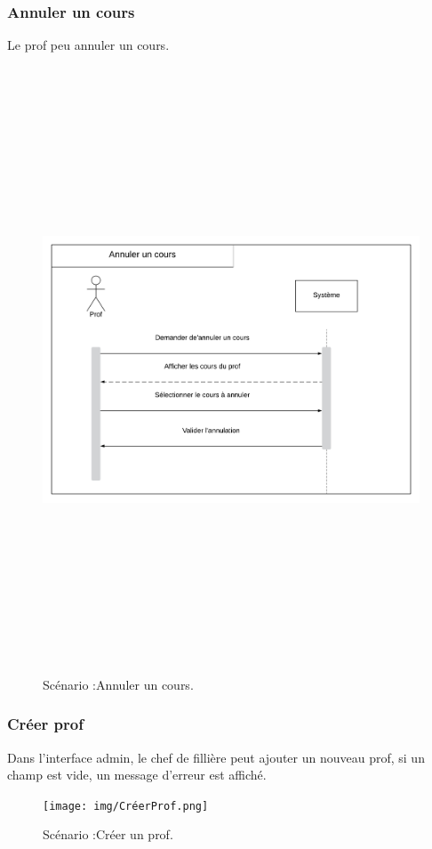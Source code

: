 \subsubsection*{Annuler un cours}
Le prof peu annuler un cours.
 \begin{figure}[!htb]
      \centering
        \includegraphics[width=15cm,height=18cm]{img/AnnulerCours.png}
        \caption{Scénario :Annuler un cours. }
    \end{figure}
\newpage
\subsubsection*{Créer prof}
Dans l'interface admin, le chef de fillière peut ajouter un nouveau prof, si un champ est vide, un message d'erreur est affiché.
 \begin{figure}[!htb]
      \centering
        \texttt{[image: img/CréerProf.png]}
        \caption{Scénario :Créer un prof. }
    \end{figure}
\newpage
